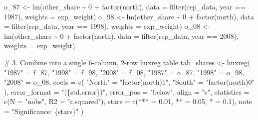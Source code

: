 \documentclass[
  letterpaper,
  DIV=11,
  numbers=noendperiod]{scrartcl}
\newenvironment{Shaded}{\begin{snugshade}}{\end{snugshade}}
\newcommand{\AttributeTok}[1]{\textcolor[rgb]{0.40,0.45,0.13}{#1}}
\newcommand{\CommentTok}[1]{\textcolor[rgb]{0.37,0.37,0.37}{#1}}
\newcommand{\DecValTok}[1]{\textcolor[rgb]{0.68,0.00,0.00}{#1}}
\newcommand{\FloatTok}[1]{\textcolor[rgb]{0.68,0.00,0.00}{#1}}
\newcommand{\FunctionTok}[1]{\textcolor[rgb]{0.28,0.35,0.67}{#1}}
\newcommand{\NormalTok}[1]{\textcolor[rgb]{0.00,0.23,0.31}{#1}}
\newcommand{\OtherTok}[1]{\textcolor[rgb]{0.00,0.23,0.31}{#1}}
\newcommand{\SpecialCharTok}[1]{\textcolor[rgb]{0.37,0.37,0.37}{#1}}
\newcommand{\StringTok}[1]{\textcolor[rgb]{0.13,0.47,0.30}{#1}}
\begin{document}
\begin{Shaded}
\begin{Highlighting}[]
\NormalTok{o\_87 }\OtherTok{\textless{}{-}} \FunctionTok{lm}\NormalTok{(other\_share }\SpecialCharTok{\textasciitilde{}} \DecValTok{0} \SpecialCharTok{+} \FunctionTok{factor}\NormalTok{(north), }\AttributeTok{data =} \FunctionTok{filter}\NormalTok{(rep\_data, year }\SpecialCharTok{==} \DecValTok{1987}\NormalTok{), }\AttributeTok{weights =}\NormalTok{ exp\_weight)}
\NormalTok{o\_98 }\OtherTok{\textless{}{-}} \FunctionTok{lm}\NormalTok{(other\_share }\SpecialCharTok{\textasciitilde{}} \DecValTok{0} \SpecialCharTok{+} \FunctionTok{factor}\NormalTok{(north), }\AttributeTok{data =} \FunctionTok{filter}\NormalTok{(rep\_data, year }\SpecialCharTok{==} \DecValTok{1998}\NormalTok{), }\AttributeTok{weights =}\NormalTok{ exp\_weight)}
\NormalTok{o\_08 }\OtherTok{\textless{}{-}} \FunctionTok{lm}\NormalTok{(other\_share }\SpecialCharTok{\textasciitilde{}} \DecValTok{0} \SpecialCharTok{+} \FunctionTok{factor}\NormalTok{(north), }\AttributeTok{data =} \FunctionTok{filter}\NormalTok{(rep\_data, year }\SpecialCharTok{==} \DecValTok{2008}\NormalTok{), }\AttributeTok{weights =}\NormalTok{ exp\_weight)}

\CommentTok{\# 3. Combine into a single 6{-}column, 2{-}row huxreg table}
\NormalTok{tab\_shares }\OtherTok{\textless{}{-}} \FunctionTok{huxreg}\NormalTok{(}
  \StringTok{"1987"} \OtherTok{=}\NormalTok{ f\_87, }\StringTok{"1998"} \OtherTok{=}\NormalTok{ f\_98, }\StringTok{"2008"} \OtherTok{=}\NormalTok{ f\_08,}
  \StringTok{"1987"} \OtherTok{=}\NormalTok{ o\_87, }\StringTok{"1998"} \OtherTok{=}\NormalTok{ o\_98, }\StringTok{"2008"} \OtherTok{=}\NormalTok{ o\_08,}
  \AttributeTok{coefs =} \FunctionTok{c}\NormalTok{(}
    \StringTok{"North"} \OtherTok{=} \StringTok{"factor(north)1"}\NormalTok{,}
    \StringTok{"South"} \OtherTok{=} \StringTok{"factor(north)0"}
\NormalTok{  ),}
  \AttributeTok{error\_format =} \StringTok{"(\{std.error\})"}\NormalTok{,}
  \AttributeTok{error\_pos =} \StringTok{"below"}\NormalTok{,}
  \AttributeTok{align =} \StringTok{"c"}\NormalTok{,}
  \AttributeTok{statistics =} \FunctionTok{c}\NormalTok{(}\AttributeTok{N =} \StringTok{"nobs"}\NormalTok{, }\AttributeTok{R2 =} \StringTok{"r.squared"}\NormalTok{),}
  \AttributeTok{stars =} \FunctionTok{c}\NormalTok{(}\StringTok{\textasciigrave{}}\AttributeTok{***}\StringTok{\textasciigrave{}} \OtherTok{=} \FloatTok{0.01}\NormalTok{, }\StringTok{\textasciigrave{}}\AttributeTok{**}\StringTok{\textasciigrave{}} \OtherTok{=} \FloatTok{0.05}\NormalTok{, }\StringTok{\textasciigrave{}}\AttributeTok{*}\StringTok{\textasciigrave{}} \OtherTok{=} \FloatTok{0.1}\NormalTok{),}
  \AttributeTok{note =} \StringTok{"Significance: \{stars\}"}
\NormalTok{)}


\end{Highlighting}
\end{Shaded}
\end{document}

